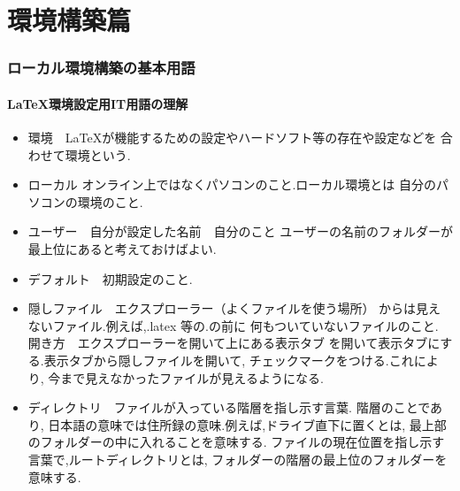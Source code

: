 \documentclass{ltjsarticle}
\begin{document}
\part{環境構築篇}
\section{ローカル環境構築の基本用語}
\subsection{\LaTeX 環境設定用IT用語の理解}

\begin{itemize}
  \item 環境　\LaTeX が機能するための設定やハードソフト等の存在や設定などを
        合わせて環境という.
  \item ローカル  オンライン上ではなくパソコンのこと.ローカル環境とは
        自分のパソコンの環境のこと.
  \item ユーザー　自分が設定した名前　自分のこと
        ユーザーの名前のフォルダーが最上位にあると考えておけばよい.
  \item デフォルト　初期設定のこと.
  \item 隠しファイル　エクスプローラー（よくファイルを使う場所）
        からは見えないファイル.例えば,.latex 等の.の前に
        何もついていないファイルのこと.
        開き方　エクスプローラーを開いて上にある表示タブ
        を開いて表示タブにする.表示タブから隠しファイルを開いて,
        チェックマークをつける.これにより,
        今まで見えなかったファイルが見えるようになる.

  \item ディレクトリ　ファイルが入っている階層を指し示す言葉.
        階層のことであり,
        日本語の意味では住所録の意味.例えば,ドライブ直下に置くとは,
        最上部のフォルダーの中に入れることを意味する.
        ファイルの現在位置を指し示す言葉で,ルートディレクトリとは,
        フォルダーの階層の最上位のフォルダーを意味する.



\end{itemize}
\end{document}
